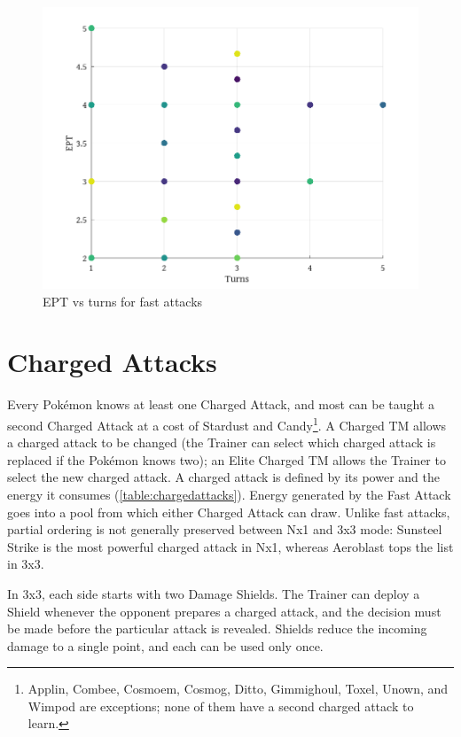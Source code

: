 \begin{figure}[hb]
\includegraphics[keepaspectratio,width=\textwidth]{octave/eptvst.png}
\caption{EPT vs turns for fast attacks}
\label{fig:eptvst}
\end{figure}

\section{Charged Attacks}
\label{sec:charged}
Every Pokémon knows at least one Charged Attack, and most can be taught a second
  Charged Attack at a cost of Stardust and Candy\footnote{Applin, Combee,
  Cosmoem, Cosmog, Ditto, Gimmighoul, Toxel, Unown, and Wimpod are exceptions;
  none of them have a second charged attack to learn.}.
A Charged TM allows a charged attack to be changed (the Trainer can select
  which charged attack is replaced if the Pokémon knows two);
  an Elite Charged TM allows the Trainer to select the new charged attack.
A charged attack is defined by its power and the energy it consumes (\autoref{table:chargedattacks}).
Energy generated by the Fast Attack goes into a pool from which either Charged Attack can draw.
Unlike fast attacks, partial ordering is not generally preserved between Nx1 and 3x3 mode:
  Sunsteel Strike is the most powerful charged attack in Nx1, whereas Aeroblast tops
  the list in 3x3.


In 3x3, each side starts with two Damage Shields.
The Trainer can deploy a Shield whenever the opponent prepares a charged attack,
   and the decision must be made before the particular attack is revealed.
Shields reduce the incoming damage to a single point, and each can be used only once.

